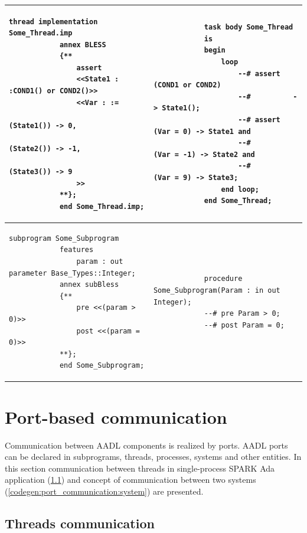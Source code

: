 \begin{center}
\begin{longtable}{| p{3in} | p{3in} |}
		\\ \hline

		\begin{lstlisting}[language=bless]
			thread implementation Some_Thread.imp
			annex BLESS 
			{**
				assert
				<<State1 : :COND1() or COND2()>>
				<<Var : :=
  								(State1()) -> 0,
  								(State2()) -> -1,
  								(State3()) -> 9
				>>
			**};
			end Some_Thread.imp;
		\end{lstlisting} 
		& 
		\begin{lstlisting}
			task body Some_Thread
			is
			begin
				loop
					--# assert (COND1 or COND2)
					--#          -> State1();
					--# assert (Var = 0) -> State1 and
					--#        (Var = -1) -> State2 and
					--#        (Var = 9) -> State3;
				end loop;
			end Some_Thread;
		\end{lstlisting} 

		\\ \hline

		\begin{lstlisting}[language=bless]
			subprogram Some_Subprogram
			features 
				param : out parameter Base_Types::Integer;
			annex subBless
			{**
				pre <<(param > 0)>>
				post <<(param = 0)>>
			**};
			end Some_Subprogram;
		\end{lstlisting} 
		& 
		\begin{lstlisting}
			procedure Some_Subprogram(Param : in out Integer);
		    --# pre Param > 0;
		    --# post Param = 0;
		\end{lstlisting} 

		\\ \hline
	\end{longtable}
\end{center}
\doublespacing


\section{Port-based communication}
\label{codegen:port_communication}

Communication between AADL components is realized by ports. AADL ports can be declared in subprograms, threads, processes, systems and other entities. In this section communication between threads in single-process SPARK Ada application (\ref{codegen:port_communication:thread}) and concept of communication between two systems (\ref{codegen:port_communication:system}) are presented. 


\subsection{Threads communication}
\label{codegen:port_communication:thread}

